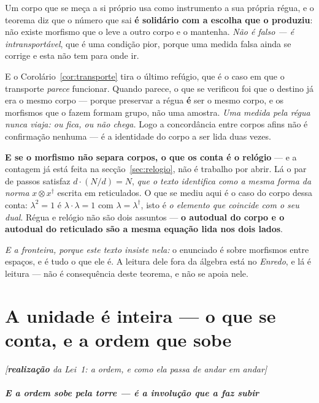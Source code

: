\documentclass[livro.tex]{subfiles}
\begin{document}
\begin{obs}
Um corpo que se meça a si próprio usa como instrumento a sua própria régua, e o teorema diz que o
número que sai \textbf{é solidário com a escolha que o produziu}: não existe morfismo que o leve a
outro corpo e o mantenha. \emph{Não é falso --- é intransportável}, que é uma condição pior, porque
uma medida falsa ainda se corrige e esta não tem para onde ir.

\smallskip
\noindent E o Corolário~\ref{cor:transporte} tira o último refúgio, que é o caso em que o transporte
\emph{parece} funcionar. Quando parece, o que se verificou foi que o destino já era o mesmo corpo ---
porque preservar a régua \textbf{é} ser o mesmo corpo, e os morfismos que o fazem formam grupo, não
uma amostra. \emph{Uma medida pela régua nunca viaja: ou fica, ou não chega.} Logo a concordância
entre corpos afins não é confirmação nenhuma --- é a identidade do corpo a ser lida duas vezes.

\smallskip
\noindent \textbf{E se o morfismo não separa corpos, o que os conta é o relógio} --- e a contagem já
está feita na secção~\ref{sec:relogio}, não é trabalho por abrir. Lá o par de passos satisfaz
$d\cdot(N/d)=N$, \emph{que o texto identifica como a mesma forma da norma} $x\otimes x^{\dagger}$
escrita em reticulados. O que se mediu aqui é o caso do corpo dessa conta: $\lambda^{2}=1$ é
$\lambda\cdot\lambda=1$ com $\lambda=\lambda^{\dagger}$, isto é \emph{o elemento que coincide com o
seu dual}. Régua e relógio não são dois assuntos --- \textbf{o autodual do corpo e o autodual do
reticulado são a mesma equação lida nos dois lados}.

\smallskip
\noindent \emph{E a fronteira, porque este texto insiste nela:} o enunciado é sobre morfismos entre
espaços, e é tudo o que ele é. A leitura dele fora da álgebra está no \emph{Enredo}, e lá é leitura ---
não é consequência deste teorema, e não se apoia nele.
\end{obs}


\part{A unidade é inteira --- o que se conta, e a ordem que sobe}
\noindent\hfill\emph{\small[\textbf{realização} da Lei~1: a ordem, e como ela passa de andar em andar]}\medskip

\subsubsection*{E a ordem sobe pela torre --- é a involução que a faz subir}
\end{document}
